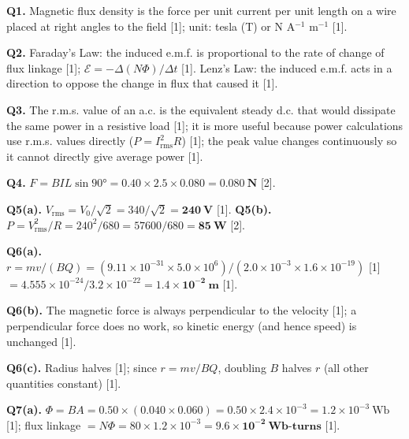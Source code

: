 \begin{markscheme}

\textbf{Q1.} Magnetic flux density is the force per unit current per unit length on a wire placed at right angles to the field [1]; unit: tesla (T) or N A$^{-1}$ m$^{-1}$ [1].

\vspace{0.5em}\textbf{Q2.} Faraday's Law: the induced e.m.f. is proportional to the rate of change of flux linkage [1]; $\mathcal{E} = -\Delta(N\Phi)/\Delta t$ [1]. Lenz's Law: the induced e.m.f. acts in a direction to oppose the change in flux that caused it [1].

\vspace{0.5em}\textbf{Q3.} The r.m.s. value of an a.c. is the equivalent steady d.c. that would dissipate the same power in a resistive load [1]; it is more useful because power calculations use r.m.s. values directly ($P = I_{\text{rms}}^2 R$) [1]; the peak value changes continuously so it cannot directly give average power [1].

\vspace{0.5em}\textbf{Q4.} $F = BIL\sin90° = 0.40 \times 2.5 \times 0.080 = \mathbf{0.080\ \text{N}}$ [2].

\vspace{0.5em}\textbf{Q5(a).} $V_{\text{rms}} = V_0/\sqrt{2} = 340/\sqrt{2} = \mathbf{240\ \text{V}}$ [1].
\textbf{Q5(b).} $P = V_{\text{rms}}^2/R = 240^2/680 = 57600/680 = \mathbf{85\ \text{W}}$ [2].

\vspace{0.5em}\textbf{Q6(a).} $r = mv/(BQ) = (9.11\times10^{-31}\times5.0\times10^6)/(2.0\times10^{-3}\times1.6\times10^{-19})$ [1] $= 4.555\times10^{-24}/3.2\times10^{-22} = \mathbf{1.4\times10^{-2}\ \text{m}}$ [1].

\vspace{0.5em}\textbf{Q6(b).} The magnetic force is always perpendicular to the velocity [1]; a perpendicular force does no work, so kinetic energy (and hence speed) is unchanged [1].

\vspace{0.5em}\textbf{Q6(c).} Radius halves [1]; since $r = mv/BQ$, doubling $B$ halves $r$ (all other quantities constant) [1].

\vspace{0.5em}\textbf{Q7(a).} $\Phi = BA = 0.50\times(0.040\times0.060) = 0.50\times2.4\times10^{-3} = 1.2\times10^{-3}\ \text{Wb}$ [1]; flux linkage $= N\Phi = 80\times1.2\times10^{-3} = \mathbf{9.6\times10^{-2}\ \text{Wb-turns}}$ [1].


\end{markscheme}
